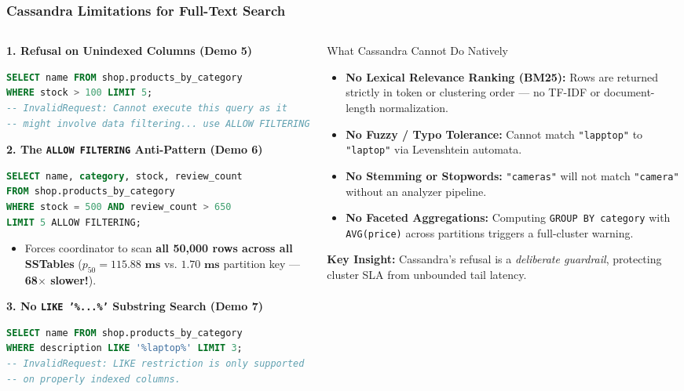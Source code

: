\documentclass[aspectratio=169]{beamer}
\begin{document}
\begin{frame}[fragile]
\frametitle{Cassandra Limitations for Full-Text Search}
\begin{columns}[T]
\begin{column}{0.52\textwidth}
\textbf{\scriptsize 1. Refusal on Unindexed Columns (Demo 5)}
\begin{lstlisting}[language=SQL]
SELECT name FROM shop.products_by_category
WHERE stock > 100 LIMIT 5;
-- InvalidRequest: Cannot execute this query as it
-- might involve data filtering... use ALLOW FILTERING
\end{lstlisting}

\textbf{\scriptsize 2. The \texttt{ALLOW FILTERING} Anti-Pattern (Demo 6)}
\begin{lstlisting}[language=SQL]
SELECT name, category, stock, review_count
FROM shop.products_by_category
WHERE stock = 500 AND review_count > 650
LIMIT 5 ALLOW FILTERING;
\end{lstlisting}
\scriptsize
\begin{itemize}
    \item Forces coordinator to scan \textbf{all 50,000 rows across all SSTables} ($p_{50} = \mathbf{115.88\text{ ms}}$ vs. $\mathbf{1.70\text{ ms}}$ partition key --- \textbf{68$\times$ slower!}).
\end{itemize}

\textbf{\scriptsize 3. No \texttt{LIKE '\%...\%'} Substring Search (Demo 7)}
\begin{lstlisting}[language=SQL]
SELECT name FROM shop.products_by_category
WHERE description LIKE '%laptop%' LIMIT 3;
-- InvalidRequest: LIKE restriction is only supported
-- on properly indexed columns.
\end{lstlisting}
\end{column}
\begin{column}{0.45\textwidth}
\begin{alertblock}{\scriptsize What Cassandra Cannot Do Natively}
\scriptsize
\begin{itemize}
    \item \textbf{No Lexical Relevance Ranking (BM25):} Rows are returned strictly in token or clustering order --- no TF-IDF or document-length normalization.
    \item \textbf{No Fuzzy / Typo Tolerance:} Cannot match \texttt{"lapptop"} to \texttt{"laptop"} via Levenshtein automata.
    \item \textbf{No Stemming or Stopwords:} \texttt{"cameras"} will not match \texttt{"camera"} without an analyzer pipeline.
    \item \textbf{No Faceted Aggregations:} Computing \texttt{GROUP BY category} with \texttt{AVG(price)} across partitions triggers a full-cluster warning.
\end{itemize}
\end{alertblock}
\vspace{0.05cm}
\scriptsize
\textbf{Key Insight:} Cassandra's refusal is a \emph{deliberate guardrail}, protecting cluster SLA from unbounded tail latency.
\end{column}
\end{columns}
\end{frame}
\end{document}
